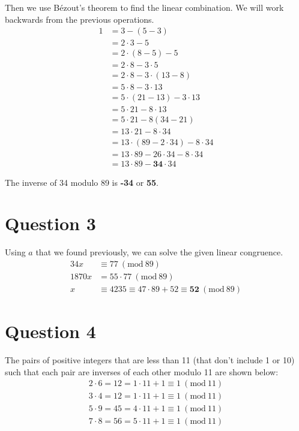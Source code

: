 \documentclass[letterpaper, 12pt]{article}
\newcommand{\PMod}[1]{\ (\mathrm{mod}\ #1)}
\begin{document}
Then we use B\'{e}zout's theorem to find the linear combination. We will work backwards from the previous operations.
\allowdisplaybreaks
\begin{align*}
    1 &= 3 - (5 - 3)\\
    &= 2 \cdot 3 - 5\\
    &= 2 \cdot (8 - 5) - 5\\
    &= 2 \cdot 8 - 3 \cdot 5\\
    &= 2 \cdot 8 - 3 \cdot (13 - 8)\\
    &= 5 \cdot 8 - 3 \cdot 13\\
    &= 5 \cdot (21 - 13) - 3 \cdot 13\\
    &= 5 \cdot 21 - 8 \cdot 13\\
    &= 5 \cdot 21 - 8 (34 - 21)\\
    &= 13 \cdot 21 - 8 \cdot 34\\
    &= 13 \cdot (89 - 2 \cdot 34) - 8 \cdot 34\\
    &= 13 \cdot 89 - 26 \cdot 34 - 8 \cdot 34\\
    &= 13 \cdot 89 - \boxed{\mathbf{34}} \cdot 34
\end{align*}

The inverse of 34 modulo 89 is \textbf{-34} or \textbf{55}.

\section*{Question 3}
Using $a$ that we found previously, we can solve the given linear congruence.
\begin{align*}
    34x &\equiv 77 \PMod{89}\\
    1870x &= 55 \cdot 77 \PMod{89}\\
    x &\equiv 4235 \equiv 47 \cdot 89 + 52 \equiv \boxed{\mathbf{52}}\PMod{89}
\end{align*}

\section*{Question 4}
The pairs of positive integers that are less than 11 (that don't include 1 or 10) such that each pair are inverses of each other modulo 11 are shown below:
\begin{align*}
    2 \cdot 6 = 12 = 1\cdot 11 + 1 \equiv 1 \PMod{11} \\
    3 \cdot 4 = 12 = 1 \cdot 11 + 1 \equiv 1 \PMod{11}\\
    5 \cdot 9 = 45 = 4 \cdot 11 + 1 \equiv 1 \PMod{11}\\
    7 \cdot 8 = 56 = 5 \cdot 11 + 1 \equiv 1 \PMod{11}
\end{align*}
\end{document}
